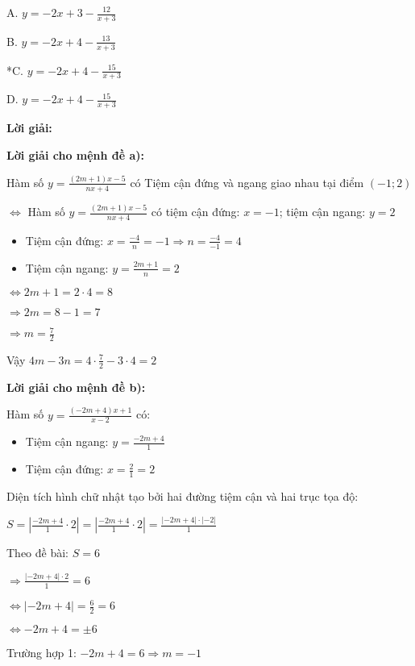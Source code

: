 \documentclass{article}
\begin{document}
A. \(y = -2x + 3 - \frac{12}{x + 3}\)

B. \(y = -2x + 4 - \frac{13}{x + 3}\)

*C. \(y = -2x + 4 - \frac{15}{x + 3}\)

D. \(y = -2x + 4 - \frac{15}{x + 3}\)


\textbf{Lời giải:}

\textbf{Lời giải cho mệnh đề a):}

Hàm số \(y = \frac{(2m + 1)x - 5}{nx + 4}\) có Tiệm cận đứng và ngang giao nhau tại điểm \((-1; 2)\)

\(\Leftrightarrow\) Hàm số \(y = \frac{(2m + 1)x - 5}{nx + 4}\) có tiệm cận đứng: \(x = -1\); tiệm cận ngang: \(y = 2\)

\begin{itemize}
\item Tiệm cận đứng:
\(x = \frac{-4}{n} = -1 \Rightarrow n = \frac{-4}{-1} = 4\)
\item Tiệm cận ngang:
\(y = \frac{2m + 1}{n} = 2\)
\end{itemize}

\(\Leftrightarrow 2m + 1 = 2 \cdot 4 = 8\)

\(\Rightarrow 2m = 8 - 1 = 7\)

\(\Rightarrow m = \frac{7}{2}\)

Vậy \(4m - 3n = 4 \cdot \frac{7}{2} - 3 \cdot 4 = 2\)

\textbf{Lời giải cho mệnh đề b):}

Hàm số \(y = \frac{(-2m + 4)x + 1}{x - 2}\) có:

\begin{itemize}
\item Tiệm cận ngang: \(y = \frac{-2m + 4}{1}\)
\item Tiệm cận đứng: \(x = \frac{2}{1} = 2\)
\end{itemize}

Diện tích hình chữ nhật tạo bởi hai đường tiệm cận và hai trục tọa độ:

\(S = \left| \frac{-2m + 4}{1} \cdot 2 \right| = \left| \frac{-2m + 4}{1} \cdot 2 \right| = \frac{|-2m + 4| \cdot |-2|}{1}\)

Theo đề bài: \(S = 6\)

\(\Rightarrow \frac{|-2m + 4| \cdot 2}{1} = 6\)

\(\Leftrightarrow |-2m + 4| = \frac{6}{2} = 6\)

\(\Leftrightarrow -2m + 4 = \pm 6\)

Trường hợp 1: \(-2m + 4 = 6 \Rightarrow m = -1\)
\end{document}
